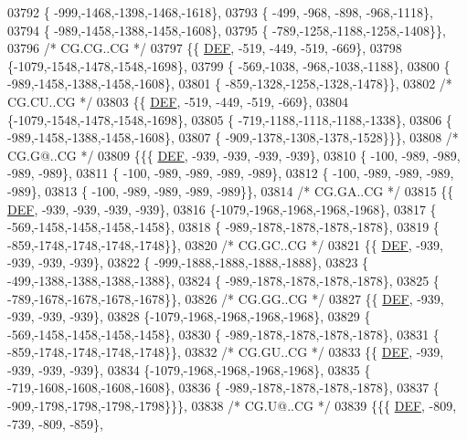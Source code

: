 \begin{DoxyCode}
03792 \{ -999,-1468,-1398,-1468,-1618\},
03793 \{ -499, -968, -898, -968,-1118\},
03794 \{ -989,-1458,-1388,-1458,-1608\},
03795 \{ -789,-1258,-1188,-1258,-1408\}\},
03796 \textcolor{comment}{/* CG.CG..CG */}
03797 \{\{  \mbox{\hyperlink{1_88_84__epars_8h_a397419fc12b37ed479c8abb9d444d843}{DEF}}, -519, -449, -519, -669\},
03798 \{-1079,-1548,-1478,-1548,-1698\},
03799 \{ -569,-1038, -968,-1038,-1188\},
03800 \{ -989,-1458,-1388,-1458,-1608\},
03801 \{ -859,-1328,-1258,-1328,-1478\}\},
03802 \textcolor{comment}{/* CG.CU..CG */}
03803 \{\{  \mbox{\hyperlink{1_88_84__epars_8h_a397419fc12b37ed479c8abb9d444d843}{DEF}}, -519, -449, -519, -669\},
03804 \{-1079,-1548,-1478,-1548,-1698\},
03805 \{ -719,-1188,-1118,-1188,-1338\},
03806 \{ -989,-1458,-1388,-1458,-1608\},
03807 \{ -909,-1378,-1308,-1378,-1528\}\}\},
03808 \textcolor{comment}{/* CG.G@..CG */}
03809 \{\{\{  \mbox{\hyperlink{1_88_84__epars_8h_a397419fc12b37ed479c8abb9d444d843}{DEF}}, -939, -939, -939, -939\},
03810 \{ -100, -989, -989, -989, -989\},
03811 \{ -100, -989, -989, -989, -989\},
03812 \{ -100, -989, -989, -989, -989\},
03813 \{ -100, -989, -989, -989, -989\}\},
03814 \textcolor{comment}{/* CG.GA..CG */}
03815 \{\{  \mbox{\hyperlink{1_88_84__epars_8h_a397419fc12b37ed479c8abb9d444d843}{DEF}}, -939, -939, -939, -939\},
03816 \{-1079,-1968,-1968,-1968,-1968\},
03817 \{ -569,-1458,-1458,-1458,-1458\},
03818 \{ -989,-1878,-1878,-1878,-1878\},
03819 \{ -859,-1748,-1748,-1748,-1748\}\},
03820 \textcolor{comment}{/* CG.GC..CG */}
03821 \{\{  \mbox{\hyperlink{1_88_84__epars_8h_a397419fc12b37ed479c8abb9d444d843}{DEF}}, -939, -939, -939, -939\},
03822 \{ -999,-1888,-1888,-1888,-1888\},
03823 \{ -499,-1388,-1388,-1388,-1388\},
03824 \{ -989,-1878,-1878,-1878,-1878\},
03825 \{ -789,-1678,-1678,-1678,-1678\}\},
03826 \textcolor{comment}{/* CG.GG..CG */}
03827 \{\{  \mbox{\hyperlink{1_88_84__epars_8h_a397419fc12b37ed479c8abb9d444d843}{DEF}}, -939, -939, -939, -939\},
03828 \{-1079,-1968,-1968,-1968,-1968\},
03829 \{ -569,-1458,-1458,-1458,-1458\},
03830 \{ -989,-1878,-1878,-1878,-1878\},
03831 \{ -859,-1748,-1748,-1748,-1748\}\},
03832 \textcolor{comment}{/* CG.GU..CG */}
03833 \{\{  \mbox{\hyperlink{1_88_84__epars_8h_a397419fc12b37ed479c8abb9d444d843}{DEF}}, -939, -939, -939, -939\},
03834 \{-1079,-1968,-1968,-1968,-1968\},
03835 \{ -719,-1608,-1608,-1608,-1608\},
03836 \{ -989,-1878,-1878,-1878,-1878\},
03837 \{ -909,-1798,-1798,-1798,-1798\}\}\},
03838 \textcolor{comment}{/* CG.U@..CG */}
03839 \{\{\{  \mbox{\hyperlink{1_88_84__epars_8h_a397419fc12b37ed479c8abb9d444d843}{DEF}}, -809, -739, -809, -859\},

\end{DoxyCode}
